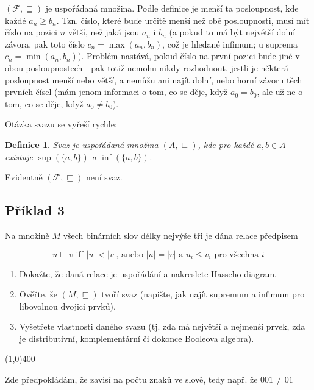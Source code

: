 \documentclass{article}
\newtheorem{definice}{Definice}[section]
\begin{document}
$(\mathcal{F},\sqsubseteq)$ je uspořádaná množina. Podle definice je menší ta posloupnost, kde každé $a_n \geq b_n$. Tzn. číslo, které bude určitě menší než obě posloupnosti, musí mít číslo na pozici $n$ větší, než jaká jsou $a_n$ i $b_n$ (a pokud to má být největší dolní závora, pak toto číslo $c_n = \max(a_n, b_n)$, což je hledané infimum; u suprema $c_n = \min(a_n, b_n)$). Problém nastává, pokud číslo na první pozici bude jiné v obou posloupnostech - pak totiž nemohu nikdy rozhodnout, jestli je některá posloupnost menší nebo větší, a nemůžu ani najít dolní, nebo horní závoru těch prvních čísel (mám jenom informaci o tom, co se děje, když $a_0 = b_0$, ale už ne o tom, co se děje, když $a_0 \neq b_0$). 

Otázka svazu se vyřeší rychle:

\begin{definice}
Svaz je uspořádaná množina $(A,\sqsubseteq)$, kde pro každé $a,b \in A$ existuje $\sup(\{a,b\})$ a $\inf(\{a,b\})$. 
\end{definice}

Evidentně $(\mathcal{F},\sqsubseteq)$ není svaz.

\subsection{Příklad 3}
Na množině $M$ všech binárních slov délky nejvýše tři je dána relace předpisem

\[ u \sqsubseteq v \text{ iff } |u| < |v| \text {, anebo }  |u| = |v| \mbox{ a } u_i \leq v_i \text { pro všechna } i \]

\begin{enumerate} 
	\item Dokažte, že daná relace je uspořádání a nakreslete Hasseho diagram.
	\item Ověřte, že $(M,\sqsubseteq)$ tvoří svaz (napište, jak najít supremum a infimum pro libovolnou dvojici prvků).
	\item Vyšetřete vlastnosti daného svazu (tj. zda má největší a nejmenší prvek, zda je distributivní, komplementární či dokonce Booleova algebra).
\end{enumerate}

\line(1,0){400}

Zde předpokládám, že zavisí na počtu znaků ve slově, tedy např. že $001 \neq 01$
\end{document}
